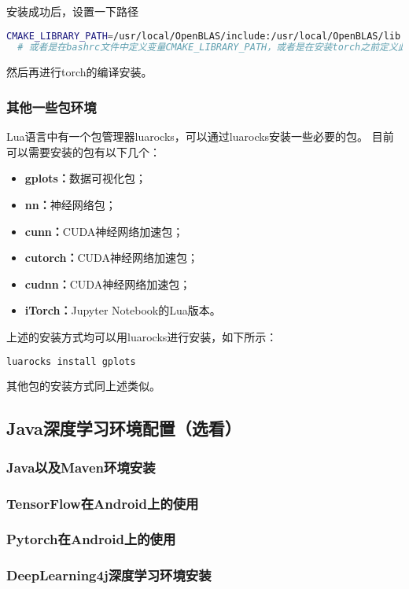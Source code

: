 \documentclass[lang=cn,a4paper,newtx]{elegantpaper}
\begin{document}
安装成功后，设置一下路径
\begin{lstlisting}[language=bash]
  CMAKE_LIBRARY_PATH=/usr/local/OpenBLAS/include:/usr/local/OpenBLAS/lib:$CMAKE_LIBRARY_PATH
  # 或者是在bashrc文件中定义变量CMAKE_LIBRARY_PATH，或者是在安装torch之前定义此变量值
\end{lstlisting}

然后再进行torch的编译安装。

\subsubsection{其他一些包环境}
Lua语言中有一个包管理器luarocks，可以通过luarocks安装一些必要的包。
目前可以需要安装的包有以下几个：
\begin{itemize}
  \item \textbf{gplots：}数据可视化包；
  \item \textbf{nn：}神经网络包；
  \item \textbf{cunn：}CUDA神经网络加速包；
  \item \textbf{cutorch：}CUDA神经网络加速包；
  \item \textbf{cudnn：}CUDA神经网络加速包；
  \item \textbf{iTorch：}Jupyter Notebook的Lua版本。
\end{itemize}

上述的安装方式均可以用luarocks进行安装，如下所示：
\begin{lstlisting}[language=bash]
  luarocks install gplots 
\end{lstlisting}

其他包的安装方式同上述类似。

\subsection{Java深度学习环境配置（选看）}
\subsubsection{Java以及Maven环境安装}
\subsubsection{TensorFlow在Android上的使用}
\subsubsection{Pytorch在Android上的使用}
\subsubsection{DeepLearning4j深度学习环境安装}
\end{document}

